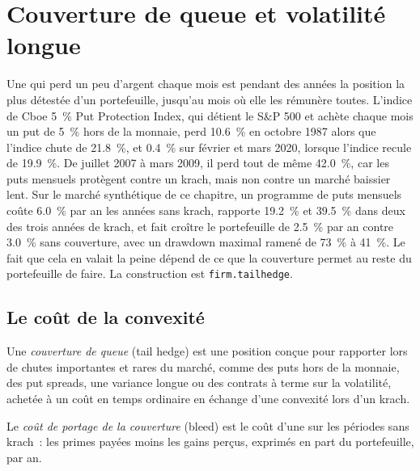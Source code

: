 \chapter{Couverture de queue et volatilité longue}\label{ch:s2:tail-hedging-and-long-volatility}

Une  qui perd un peu d'argent chaque mois est pendant des années la position la plus détestée d'un portefeuille, jusqu'au mois où elle les rémunère toutes. L'indice de Cboe
5~\% Put Protection Index, qui détient le S\&P 500 et achète chaque mois un put de 5~\% hors de la monnaie, perd 10.6~\% en octobre 1987 alors que l'indice chute
de 21.8~\%, et 0.4~\% sur février et mars 2020, lorsque l'indice recule de 19.9~\%. De juillet 2007 à mars 2009, il perd tout de même 42.0~\%, car les puts mensuels
protègent contre un krach, mais non contre un marché baissier lent. Sur le marché synthétique de ce chapitre, un programme de puts mensuels coûte 6.0~\% par an les années
sans krach, rapporte 19.2~\% et 39.5~\% dans deux des trois années de krach, et fait croître le portefeuille de 2.5~\% par an contre 3.0~\% sans couverture,
avec un drawdown maximal ramené de 73~\% à 41~\%. Le fait que cela en valait la peine dépend de ce que la couverture permet au reste du portefeuille de faire. La construction est
\texttt{firm.tailhedge}.

\section{Le coût de la convexité}

\begin{definition}\label{def:s2:tail-hedging-and-long-volatility:hedge}
Une \emph{couverture de queue} (tail hedge) est une position conçue pour rapporter lors de chutes importantes et rares du marché, comme des puts hors de la monnaie, des put spreads, une variance longue
ou des contrats à terme sur la volatilité, achetée à un coût en temps ordinaire en échange d'une convexité lors d'un krach.
\end{definition}

\begin{definition}\label{def:s2:tail-hedging-and-long-volatility:bleed}
Le \emph{coût de portage de la couverture} (bleed) est le coût d'une  sur les périodes sans krach~: les primes payées moins les gains perçus, exprimés en part du
portefeuille, par an.
\end{definition}

